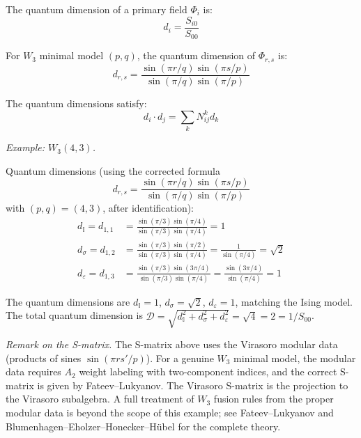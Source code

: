 \begin{definition}\label{def:quantum-dimension}
The quantum dimension of a primary field $\Phi_i$ is:
\begin{equation}
d_i = \frac{S_{i0}}{S_{00}}
\end{equation}
\end{definition}

\begin{proposition}\label{prop:quantum-dim-formula}
For $W_3$ minimal model $(p,q)$, the quantum dimension of $\Phi_{r,s}$ is:
\begin{equation}
d_{r,s} = \frac{\sin(\pi r/q) \sin(\pi s/p)}{\sin(\pi/q)\sin(\pi/p)}
\end{equation}
\end{proposition}

\begin{verification}\label{verif:quantum-dim-mult}
The quantum dimensions satisfy:
\[d_i \cdot d_j = \sum_k N_{ij}^k d_k\]

\emph{Example: $W_3(4,3)$.}

Quantum dimensions (using the corrected formula
\[
d_{r,s} = \frac{\sin(\pi r/q)\sin(\pi s/p)}{\sin(\pi/q)\sin(\pi/p)}
\]
with $(p,q) = (4,3)$, after identification):
\begin{align}
d_{\mathbb{I}} = d_{1,1} &= \frac{\sin(\pi/3)\sin(\pi/4)}{\sin(\pi/3)\sin(\pi/4)} = 1 \\
d_{\sigma} = d_{1,2} &= \frac{\sin(\pi/3)\sin(\pi/2)}{\sin(\pi/3)\sin(\pi/4)} = \frac{1}{\sin(\pi/4)} = \sqrt{2} \\
d_{\varepsilon} = d_{1,3} &= \frac{\sin(\pi/3)\sin(3\pi/4)}{\sin(\pi/3)\sin(\pi/4)} = \frac{\sin(3\pi/4)}{\sin(\pi/4)} = 1
\end{align}

The quantum dimensions are $d_{\mathbb{I}} = 1$, $d_\sigma = \sqrt{2}$, $d_\varepsilon = 1$, matching the Ising model.  The total quantum dimension is $\mathcal{D} = \sqrt{d_{\mathbb{I}}^2 + d_\sigma^2 + d_\varepsilon^2} = \sqrt{4} = 2 = 1/S_{00}$.

\emph{Remark on the S-matrix.} The S-matrix above uses the Virasoro modular data (products of sines $\sin(\pi r s'/p)$). For a genuine $W_3$ minimal model, the modular data requires $A_2$ weight labeling with two-component indices, and the correct S-matrix is given by Fateev--Lukyanov. The Virasoro S-matrix is the projection to the Virasoro subalgebra. A full treatment of $W_3$ fusion rules from the proper modular data is beyond the scope of this example; see Fateev--Lukyanov and Blumenhagen--Eholzer--Honecker--H\"ubel for the complete theory.
\end{verification}

